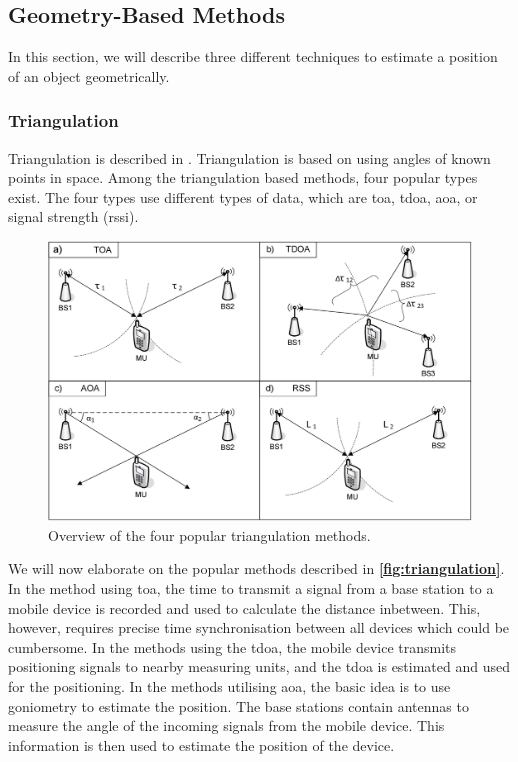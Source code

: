 \subsection{Geometry-Based Methods}
In this section, we will describe three different techniques to estimate a position of an object geometrically.

\subsubsection{Triangulation} \label{sec:triangulation}
Triangulation is described in \cite{Triangulation}. Triangulation is based on using angles of known points in space. Among the triangulation based methods, four popular types exist. The four types use different types of data, which are \gls{toa}, \gls{tdoa}, \gls{aoa}, or signal strength (\gls{rssi}).

\begin{figure}[H]
    \centering
    \includegraphics[scale=0.9939]{Images/ProblemAnalysis/triangulation.PNG}
    \caption{Overview of the four popular triangulation methods.\cite{triangulation01}}
    \label{fig:triangulation}
\end{figure}

We will now elaborate on the popular methods described in \textbf{\autoref{fig:triangulation}}. In the method using \gls{toa}, the time to transmit a signal from a base station to a mobile device is recorded and used to calculate the distance inbetween. This, however, requires precise time synchronisation between all devices which could be cumbersome. In the methods using the \gls{tdoa}, the mobile device transmits positioning signals to nearby measuring units, and the \gls{tdoa} is estimated and used for the positioning. In the methods utilising \gls{aoa}, the basic idea is to use goniometry to estimate the position. The base stations contain antennas to measure the angle of the incoming signals from the mobile device. This information is then used to estimate the position of the device.\cite{triangulation01}

